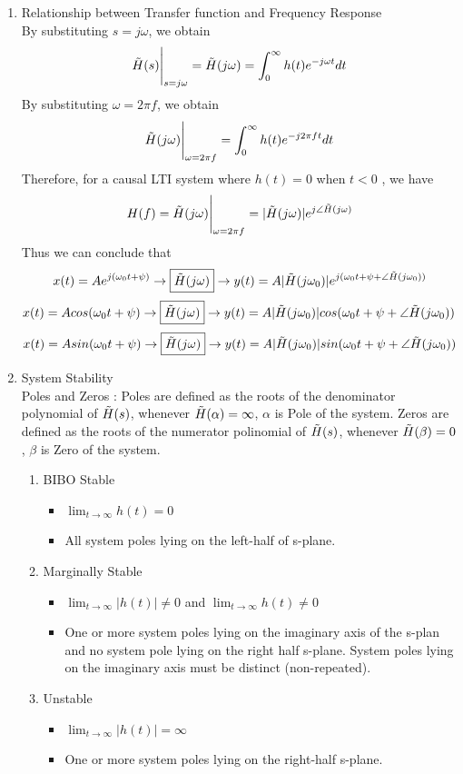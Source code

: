 \begin{enumerate}
    \item Relationship between Transfer function and Frequency Response \\
    By substituting $s = j\omega$, we obtain
    \[\Tilde{H}(s)\Bigg|_{s=j\omega}=\Tilde{H}(j\omega)=\int^\infty_0h(t)e^{-j\omega t}dt\]
    By substituting $\omega = 2\pi f$, we obtain
    \[\Tilde{H}(j\omega)\Bigg|_{\omega=2\pi f} = \int^\infty_0h(t)e^{-j2\pi ft}dt\]
    Therefore, for a causal LTI system where $h(t) = 0$ when $t < 0$ , we have 
    \[H(f) = \Tilde{H}(j\omega)\Bigg|_{\omega = 2\pi f} = |\Tilde{H}(j\omega)|e^{j\angle \Tilde{H}(j\omega)}\]
    Thus we can conclude that
    \[x(t) = Ae^{j(\omega_0t+\psi)}\rightarrow\boxed{\Tilde{H}(j\omega)}\rightarrow y(t)=A|\Tilde{H}(j\omega_0)|e^{j(\omega_0t+\psi+\angle\Tilde{H}(j\omega_0))}\]
    \[x(t) = Acos(\omega_0t+\psi)\rightarrow\boxed{\Tilde{H}(j\omega)}\rightarrow y(t)=A|\Tilde{H}(j\omega_0)|cos(\omega_0t+\psi+\angle\Tilde{H}(j\omega_0))\]
    \[x(t) = Asin(\omega_0t+\psi)\rightarrow\boxed{\Tilde{H}(j\omega)}\rightarrow y(t)=A|\Tilde{H}(j\omega_0)|sin(\omega_0t+\psi+\angle\Tilde{H}(j\omega_0))\]
    \item System Stability \\
    Poles and Zeros : Poles are defined as the roots of the denominator polynomial of $\Tilde{H}(s)$, whenever $\Tilde{H}(\alpha) = \infty$, $\alpha$ is Pole of the system. Zeros are defined as the roots of the numerator polinomial of $\Tilde{H}(s)$, whenever $\Tilde{H}(\beta) = 0$, $\beta$ is Zero of the system.
    \begin{enumerate}
        \item BIBO Stable
        \begin{itemize}
            \item $\displaystyle\lim_{t \rightarrow \infty } h(t) = 0$
            \item All system poles lying on the left-half of s-plane.
        \end{itemize}
        \item Marginally Stable
        \begin{itemize}
            \item $\displaystyle \lim_{t \rightarrow \infty }|h(t)| \neq 0$ and $\displaystyle \lim_{t \rightarrow \infty}h(t) \neq 0$
            \item One or more system poles lying on the imaginary axis of the s-plan and no system pole lying on the right half s-plane. System poles lying on the imaginary axis must be distinct (non-repeated).
        \end{itemize}
        \item Unstable 
        \begin{itemize}
            \item $\displaystyle\lim_{t \rightarrow \infty } |h(t)| = \infty $
            \item One or more system poles lying on the right-half s-plane.
        \end{itemize}
    \end{enumerate}
\end{enumerate}
